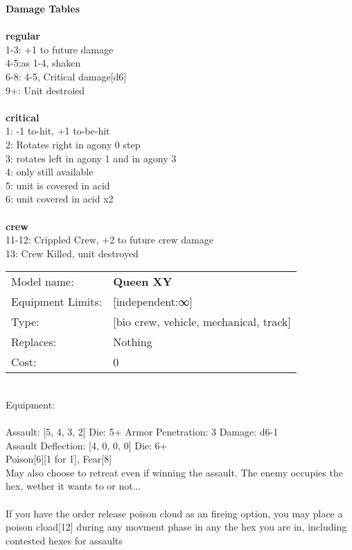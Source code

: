 {\bf Damage Tables} \\
\ \\ {\bf regular } \\
1-3: +1 to future damage \\
4-5:as 1-4, shaken \\
6-8: 4-5, Critical damage[d6] \\
9+: Unit destroied \\
\ \\ {\bf critical } \\
1: -1 to-hit, +1 to-be-hit \\
2: Rotates right in agony 0 step \\
3: rotates left in agony 1 and in agony 3 \\
4: only still available \\
5: unit is covered in acid \\
6: unit covered in acid x2 \\
\ \\ {\bf crew } \\
11-12: Crippled Crew, +2 to future crew damage \\
13: Crew Killed, unit destroyed \\


\noindent
\begin{tabular}{ll}
Model name: &{\bf Queen XY } \\
Equipment Limits: &[independent:∞] \\
Type: &[bio crew, vehicle, mechanical, track] \\
Replaces: &Nothing \\
Cost: & 0\\
\end{tabular}
\ \\
Equipment:  \\
\ \\
Assault: [5, 4, 3, 2] Die: 5+ Armor Penetration: 3 Damage: d6-1 \\
Assault Deflection: [4, 0, 0, 0] Die: 6+\\
\indent Poison[6][1 for 1], Fear[8]\\ 
May also choose to retreat even if winning the assault. The enemy occupies the hex, wether it wants to or not...\\ 
 
\ \\
If you have the order release poison cloud as an fireing option, you may place a poison cload[12] during any movment phase in any the hex you are in, including contested hexes for assaults\\ 

